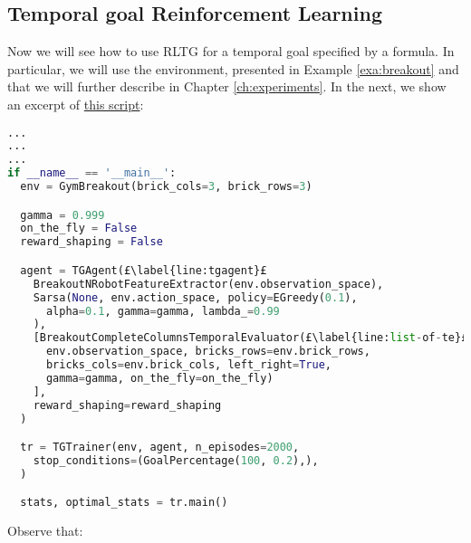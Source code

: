 \subsection{Temporal goal Reinforcement Learning}
Now we will see how to use RLTG for a temporal goal specified by a \LLf formula. In particular, we will use the \Breakout environment, presented in Example \ref{exa:breakout} and that we will further describe in Chapter \ref{ch:experiments}. In the next, we show an excerpt of \href{https://github.com/MarcoFavorito/rltg/blob/master/examples/pygames/breakout.py}{this script}:

\begin{lstlisting}[style = Python, language = Python, escapechar = £, label={ex:rltg-temporal-goal-rl-example}, caption={Temporal Goal Reinforcement Learning using RLTG}]
...
...
...
if __name__ == '__main__':
  env = GymBreakout(brick_cols=3, brick_rows=3)

  gamma = 0.999
  on_the_fly = False
  reward_shaping = False

  agent = TGAgent(£\label{line:tgagent}£
    BreakoutNRobotFeatureExtractor(env.observation_space),
    Sarsa(None, env.action_space, policy=EGreedy(0.1),
      alpha=0.1, gamma=gamma, lambda_=0.99
    ),
    [BreakoutCompleteColumnsTemporalEvaluator(£\label{line:list-of-te}£
      env.observation_space, bricks_rows=env.brick_rows,
      bricks_cols=env.brick_cols, left_right=True,
      gamma=gamma, on_the_fly=on_the_fly)
    ],
    reward_shaping=reward_shaping
  )

  tr = TGTrainer(env, agent, n_episodes=2000,
    stop_conditions=(GoalPercentage(100, 0.2),),
  )

  stats, optimal_stats = tr.main()
\end{lstlisting}
Observe that:
